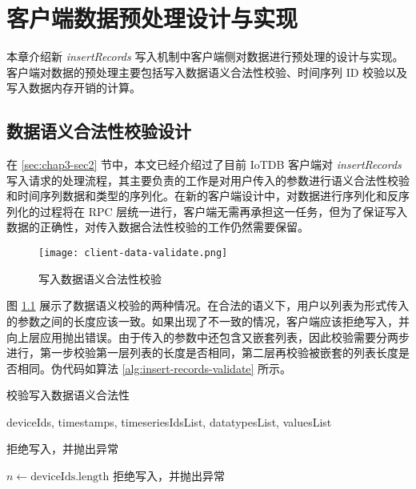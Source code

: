 
\chapter{客户端数据预处理设计与实现\label{chap:client-design}}
本章介绍新 \emph{insertRecords} 写入机制中客户端侧对数据进行预处理的设计与实现。客户端对数据的预处理主要包括写入数据语义合法性校验、时间序列 ID 校验以及写入数据内存开销的计算。
\section{数据语义合法性校验设计}
在 \ref{sec:chap3-sec2} 节中，本文已经介绍过了目前 IoTDB 客户端对 \emph{insertRecords} 写入请求的处理流程，其主要负责的工作是对用户传入的参数进行语义合法性校验和时间序列数据和类型的序列化。在新的客户端设计中，对数据进行序列化和反序列化的过程将在 RPC 层统一进行，客户端无需再承担这一任务，但为了保证写入数据的正确性，对传入数据合法性校验的工作仍然需要保留。

\begin{figure}
  \centering
  \texttt{[image: client-data-validate.png]}
  \caption{写入数据语义合法性校验}
  \label{fig:client-data-validate}
\end{figure}

图 \ref{fig:client-data-validate} 展示了数据语义校验的两种情况。在合法的语义下，用户以列表为形式传入的参数之间的长度应该一致。如果出现了不一致的情况，客户端应该拒绝写入，并向上层应用抛出错误。由于传入的参数中还包含又嵌套列表，因此校验需要分两步进行，第一步校验第一层列表的长度是否相同，第二层再校验被嵌套的列表长度是否相同。伪代码如算法 \ref{alg:insert-records-validate} 所示。

\begin{algorithm}
  \caption{校验写入数据语义合法性}
  \label{alg:insert-records-validate}
  \small
  \begin{algorithmic}
    \REQUIRE deviceIds, timestamps, timeseriesIdsList, datatypesList, valuesList

     \STATE 拒绝写入，并抛出异常
    \ENDIF

    \STATE $n \leftarrow \text{deviceIds.length}$
        \STATE 拒绝写入，并抛出异常
      \ENDIF
    \ENDFOR

  \end{algorithmic}
\end{algorithm}

